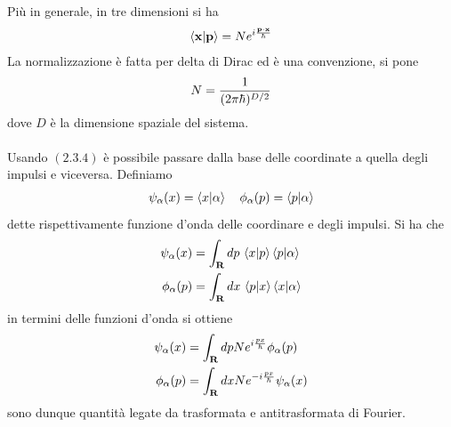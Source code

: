 \documentclass{article}
\begin{document}
Più in generale, in tre dimensioni si ha
\begin{gather}
    \braket{\mathbf{x}|\mathbf{p}} = Ne^{i\frac{\mathbf{p} \cdot \mathbf{x}}{\hbar}} \notag
\end{gather}
La normalizzazione è fatta per delta di Dirac ed è una convenzione, si pone
\begin{gather}
    N = \frac{1}{(2\pi\hbar)^{D/2}} \notag
\end{gather}
dove $D$ è la dimensione spaziale del sistema. \\ \\
Usando $(2.3.4)$ è possibile passare dalla base delle coordinate a quella degli impulsi e viceversa. Definiamo
\begin{gather}
    \psi_\alpha(x) = \braket{x|\alpha} \quad \phi_\alpha(p) = \braket{p|\alpha} \notag
\end{gather}
dette rispettivamente funzione d'onda delle coordinare e degli impulsi. Si ha che
\begin{align}
    \psi_\alpha(x) &= \int_{\mathbf{R}} dp \, \braket{x|p}\braket{p|\alpha} \notag \\
    \phi_\alpha(p) &= \int_{\mathbf{R}} dx \, \braket{p|x}\braket{x|\alpha} \notag
\end{align}
in termini delle funzioni d'onda si ottiene
\begin{align}
    \psi_\alpha(x) &= \int_{\mathbf{R}} dp Ne^{i\frac{px}{\hbar}}\phi_\alpha(p) \notag \\
    \phi_\alpha(p) &= \int_{\mathbf{R}} dx Ne^{-i\frac{px}{\hbar}}\psi_\alpha(x) \notag
\end{align}
sono dunque quantità legate da trasformata e antitrasformata di Fourier.
\end{document}
